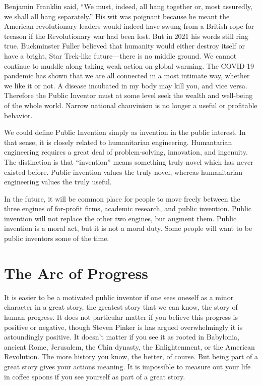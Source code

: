 \documentclass[
	fontsize=10pt, %
	twoside=false, %
	secnumdepth=1, %
]{kaobook}
\begin{document}
Benjamin Franklin said, ``We must, indeed, all hang together or,
most assuredly, we shall all hang separately.''
His wit was poignant because he meant the American revolutionary
leaders would indeed have swung from a British rope for treason
if the Revolutionary war had been lost.
But in 2021 his words still ring true. Buckminster Fuller
believed that humanity would either destroy itself or
have a bright, Star Trek-like future---there is no
middle ground.
We cannot continue to muddle along
taking weak action on global warming.
The COVID-19 pandemic has shown that we are all connected
in a most intimate way, whether we like it or not.
A disease incubated in my body may kill you, and vice versa.
Therefore the Public Inventor must at some level seek
the wealth and well-being of the whole world.
Narrow national chauvinism is no longer a useful or profitable
behavior.

We could define Public Invention simply as invention in the
public interest.
In that sense, it is closely related to humanitarian engineering.
Humantarian engineering requires a great deal of problem-solving,
innovation, and ingenuity. The distinction is that ``invention''
means something truly novel which has never existed before.
Public  invention values the truly novel, whereas
humanitarian engineering values the truly useful.

In the future, it will be common place for people to move freely
between
the three engines of for-profit firms, academic research,
and public invention.
Public invention will not replace the other two engines,
but augment them.
Public invention is a moral act, but it is not a moral duty.
Some people will want to be public inventors some of the time.

\chapter{The Arc of Progress}

It is easier to be a motivated public inventor
if one sees oneself as a minor character in a great story,
the greatest story that we can know, the story of human progress.
It does not particular matter if you believe this progress
is positive or negative, though Steven Pinker is has argued overwhelmingly it
is astoundingly positive. \cite{Pinker2019}
It doesn't matter if you see it as rooted in
Babylonia, ancient Rome, Jerusalem, the Chin dynasty, the
Enlightenment, or the American Revolution.
The more history you know, the better, of course.
But being part of a great story gives your actions meaning.
It is impossible to measure out your life in coffee spoons
if you see yourself as part of a great story.
\end{document}
